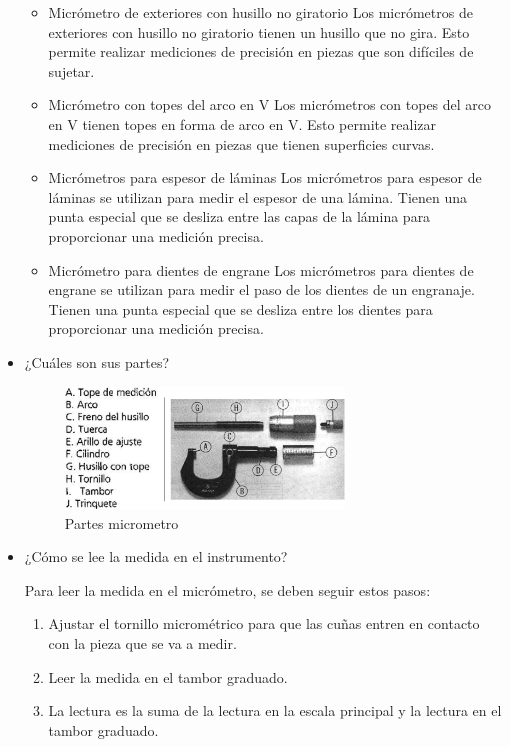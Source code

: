 \documentclass{article}
\theoremstyle{mytheoremstyle}
\theoremstyle{mytheoremstyle}
\theoremstyle{myproblemstyle}
\begin{document}
\begin{itemize}
\begin{itemize}
		      \item Micrómetro de exteriores con husillo no giratorio\newline
		            Los micrómetros de exteriores con husillo no giratorio tienen un husillo que no gira. Esto permite realizar mediciones de precisión en piezas que son difíciles de sujetar.
		      \item Micrómetro con topes del arco en V\newline
		            Los micrómetros con topes del arco en V tienen topes en forma de arco en V. Esto permite realizar mediciones de precisión en piezas que tienen superficies curvas.
		      \item Micrómetros para espesor de láminas\newline
		            Los micrómetros para espesor de láminas se utilizan para medir el espesor de una lámina. Tienen una punta especial que se desliza entre las capas de la lámina para proporcionar una medición precisa.
		      \item Micrómetro para dientes de engrane\newline
		            Los micrómetros para dientes de engrane se utilizan para medir el paso de los dientes de un engranaje. Tienen una punta especial que se desliza entre los dientes para proporcionar una medición precisa.

	      \end{itemize}


	\item ¿Cuáles son sus partes?
	      \begin{figure}[H]
		      \centering
		      \includegraphics[width=0.7\textwidth]{micrometro.png}
		      \caption{Partes micrometro}
		      \label{fig:imagen2}
	      \end{figure}

	\item¿Cómo se lee la medida en el instrumento?

	      Para leer la medida en el micrómetro, se deben seguir estos pasos:
	      \begin{enumerate}
		      \item Ajustar el tornillo micrométrico para que las cuñas entren en contacto con la pieza que se va a medir.
		      \item Leer la medida en el tambor graduado.
		      \item La lectura es la suma de la lectura en la escala principal y la lectura en el tambor graduado.
	      \end{enumerate}






\end{itemize}

\newpage
\end{document}
